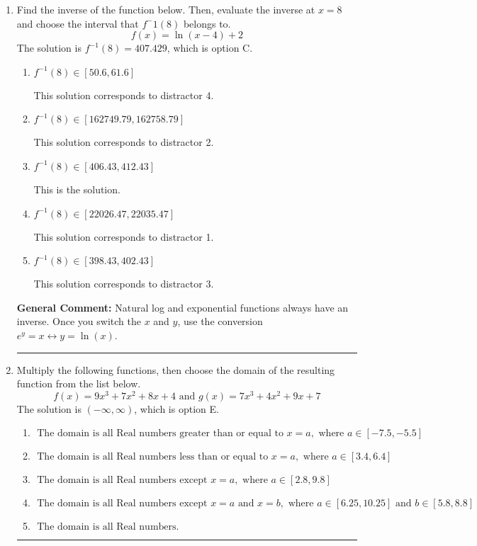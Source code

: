 \documentclass{extbook}[14pt]
\newcommand{\litem}[1]{\item #1

\rule{\textwidth}{0.4pt}}
\begin{document}
\begin{enumerate}\litem{
Find the inverse of the function below. Then, evaluate the inverse at $x = 8$ and choose the interval that $f^-1(8)$ belongs to.
\[ f(x) = \ln{(x-4)}+2 \]The solution is \( f^{-1}(8) = 407.429 \), which is option C.\begin{enumerate}[label=\Alph*.]
\item \( f^{-1}(8) \in [50.6, 61.6] \)

 This solution corresponds to distractor 4.
\item \( f^{-1}(8) \in [162749.79, 162758.79] \)

 This solution corresponds to distractor 2.
\item \( f^{-1}(8) \in [406.43, 412.43] \)

 This is the solution.
\item \( f^{-1}(8) \in [22026.47, 22035.47] \)

 This solution corresponds to distractor 1.
\item \( f^{-1}(8) \in [398.43, 402.43] \)

 This solution corresponds to distractor 3.
\end{enumerate}

\textbf{General Comment:} Natural log and exponential functions always have an inverse. Once you switch the $x$ and $y$, use the conversion $ e^y = x \leftrightarrow y=\ln(x)$.
}
\litem{
Multiply the following functions, then choose the domain of the resulting function from the list below.
\[ f(x) = 9x^{3} +7 x^{2} +8 x + 4 \text{ and } g(x) = 7x^{3} +4 x^{2} +9 x + 7 \]The solution is \( (-\infty, \infty) \), which is option E.\begin{enumerate}[label=\Alph*.]
\item \( \text{ The domain is all Real numbers greater than or equal to } x = a, \text{ where } a \in [-7.5, -5.5] \)


\item \( \text{ The domain is all Real numbers less than or equal to } x = a, \text{ where } a \in [3.4, 6.4] \)


\item \( \text{ The domain is all Real numbers except } x = a, \text{ where } a \in [2.8, 9.8] \)


\item \( \text{ The domain is all Real numbers except } x = a \text{ and } x = b, \text{ where } a \in [6.25, 10.25] \text{ and } b \in [5.8, 8.8] \)


\item \( \text{ The domain is all Real numbers. } \)



\end{enumerate}}
\end{enumerate}
\end{document}
